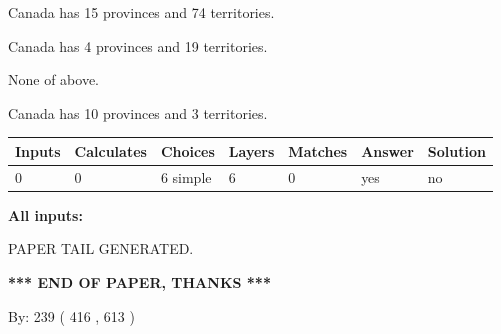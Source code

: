 \documentclass[12pt]{article}
\begin{document}
 
Canada has  15 provinces and  74 territories.
 
 
Canada has   4 provinces and  19 territories.
 
 
 None of above.
 
 
\noindent{}
 
 
Canada has 10  provinces and 3 territories.
 
 
\noindent{}
 
 
   
   
   
   
\noindent\begin{tabular}{|l|l|l|l|l|l|l|}
 \hline
Inputs & Calculates & Choices & Layers & Matches & Answer & Solution \\ \hline
 0  & 
 0  & 
 6
  simple  
  & 
 6  & 
 0  & 
  yes & 
  no 
  \\ \hline
 \end{tabular}
   
   
   
   
\noindent{}
   
   
   
   
\noindent\vspace{0.1in}\hspace{-0.08in} {\textbf{\Large{All inputs: }}}
   
   
   
   
   
   
 \vspace{0.2in}
 
   
   
\vspace{2.0in} PAPER TAIL GENERATED.
   
   
   
   
\vspace{1.0in} 
{\textbf{\large{ *** END OF PAPER, THANKS *** }}} 
   
   
\hspace{1.0in} By: 
 239 ( 416 ,  613 )
   
   
   
   
\newpage 
\setcounter{page}{ 
   516001 } 
   
   
   
\end{document}
